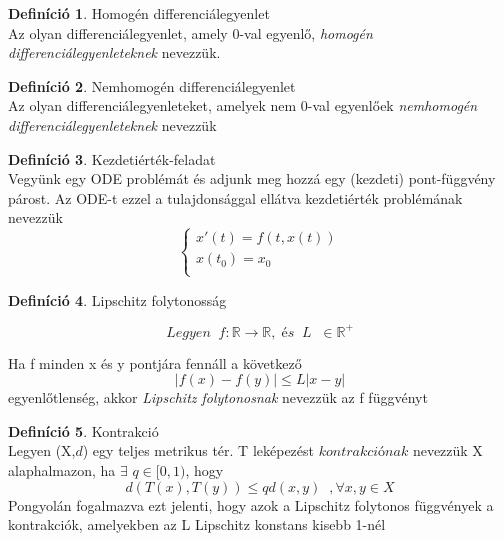 \documentclass{article}
\theoremstyle{definition}
\theoremstyle{theorem}
\newtheorem{definition}{Definíció}
\begin{document}
\begin{definition}Homogén differenciálegyenlet\\
Az olyan differenciálegyenlet, amely 0-val egyenlő, \textit{homogén differenciálegyenleteknek} nevezzük.
\end{definition}
\begin{definition}Nemhomogén differenciálegyenlet\\
Az olyan differenciálegyenleteket, amelyek nem 0-val egyenlőek \textit{nemhomogén differenciálegyenleteknek} nevezzük
\end{definition}
\begin{definition}{Kezdetiérték-feladat}\\
Vegyünk egy ODE problémát és adjunk meg hozzá egy (kezdeti) pont-függvény párost. Az ODE-t ezzel a tulajdonsággal ellátva kezdetiérték problémának  nevezzük
\begin{equation*}
    \begin{cases}
       x'(t) = f(t,x(t))\\
       x(t_0) = x_0 \\
    \end{cases}
\end{equation*}
\end{definition}
\begin{definition}{Lipschitz folytonosság}

\begin{equation*}
Legyen \;\;    f : \mathbb{R} \rightarrow \mathbb{R}, \; és \;\; L\; \;\in \mathbb{R}^+
\end{equation*}

Ha f minden x és y pontjára fennáll a következő
\begin{equation*}
    |f(x) - f(y)| \leq L |x-y|
\end{equation*}
egyenlőtlenség, akkor \textit{Lipschitz folytonosnak} nevezzük az f függvényt
\end{definition}
\begin{definition}{Kontrakció}\\
Legyen (X,$\textit{d}$) egy teljes metrikus tér. T leképezést $\textit{kontrakciónak}$ nevezzük X alaphalmazon, ha $\exists$ $q \in [0,1)$, hogy
\begin{equation*}
    d(T(x),T(y)) \leq q \textit{d}(x,y) \;\;,\forall x,y \in X
\end{equation*}
Pongyolán fogalmazva ezt jelenti, hogy azok a  Lipschitz folytonos függvények a kontrakciók, amelyekben az L Lipschitz konstans kisebb 1-nél
\end{definition}
\end{document}

